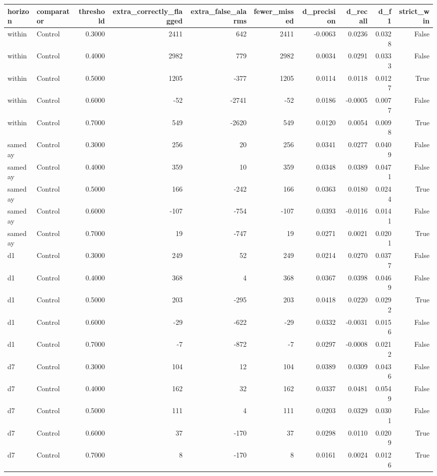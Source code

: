 \begin{tabular}{llrrrrrrrr}
\toprule
horizon & comparator & threshold & extra\_correctly\_flagged & extra\_false\_alarms & fewer\_missed & d\_precision & d\_recall & d\_f1 & strict\_win \\
\midrule
within & Control & 0.3000 & 2411 & 642 & 2411 & -0.0063 & 0.0236 & 0.0328 & False \\
within & Control & 0.4000 & 2982 & 779 & 2982 & 0.0034 & 0.0291 & 0.0333 & False \\
within & Control & 0.5000 & 1205 & -377 & 1205 & 0.0114 & 0.0118 & 0.0127 & True \\
within & Control & 0.6000 & -52 & -2741 & -52 & 0.0186 & -0.0005 & 0.0077 & False \\
within & Control & 0.7000 & 549 & -2620 & 549 & 0.0120 & 0.0054 & 0.0098 & True \\
sameday & Control & 0.3000 & 256 & 20 & 256 & 0.0341 & 0.0277 & 0.0409 & False \\
sameday & Control & 0.4000 & 359 & 10 & 359 & 0.0348 & 0.0389 & 0.0471 & False \\
sameday & Control & 0.5000 & 166 & -242 & 166 & 0.0363 & 0.0180 & 0.0244 & True \\
sameday & Control & 0.6000 & -107 & -754 & -107 & 0.0393 & -0.0116 & 0.0141 & False \\
sameday & Control & 0.7000 & 19 & -747 & 19 & 0.0271 & 0.0021 & 0.0201 & True \\
d1 & Control & 0.3000 & 249 & 52 & 249 & 0.0214 & 0.0270 & 0.0377 & False \\
d1 & Control & 0.4000 & 368 & 4 & 368 & 0.0367 & 0.0398 & 0.0469 & False \\
d1 & Control & 0.5000 & 203 & -295 & 203 & 0.0418 & 0.0220 & 0.0292 & True \\
d1 & Control & 0.6000 & -29 & -622 & -29 & 0.0332 & -0.0031 & 0.0156 & False \\
d1 & Control & 0.7000 & -7 & -872 & -7 & 0.0297 & -0.0008 & 0.0212 & False \\
d7 & Control & 0.3000 & 104 & 12 & 104 & 0.0389 & 0.0309 & 0.0436 & False \\
d7 & Control & 0.4000 & 162 & 32 & 162 & 0.0337 & 0.0481 & 0.0549 & False \\
d7 & Control & 0.5000 & 111 & 4 & 111 & 0.0203 & 0.0329 & 0.0301 & False \\
d7 & Control & 0.6000 & 37 & -170 & 37 & 0.0298 & 0.0110 & 0.0209 & True \\
d7 & Control & 0.7000 & 8 & -170 & 8 & 0.0161 & 0.0024 & 0.0126 & True \\

\end{tabular}
